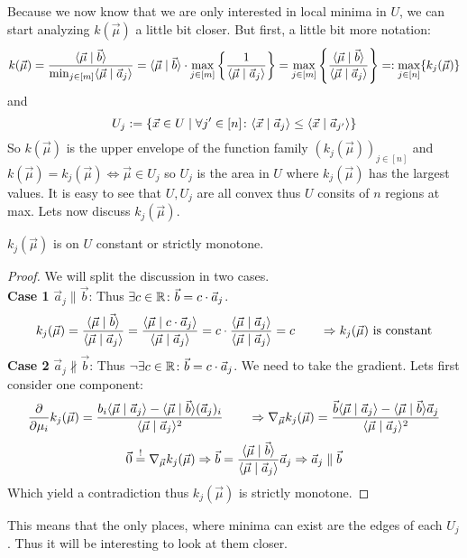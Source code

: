 Because we now know that we are only interested in local minima in $U$, we can start analyzing $k(\vec \mu)$ a little bit closer. But first, a little bit more notation:
$$k(\vec \mu) = \frac{\langle \vec{\mu} \mid \vec b \rangle}{\min_{j \in [m]} \langle \vec \mu \mid \vec a_j \rangle} = \langle \vec{\mu} \mid \vec b \rangle\cdot\max_{j \in [m]}\left\{\frac{1}{\langle \vec \mu \mid \vec a_j \rangle}\right\} = \max_{j \in [m]}\left\{\frac{\langle \vec{\mu} \mid \vec b \rangle}{\langle \vec \mu \mid \vec a_j \rangle}\right\} =: \max_{j\in[n]}\{k_j(\vec \mu)\}$$
and
$$U_j := \{\vec x \in U \mid \forall j' \in [n]\colon \langle \vec x \mid \vec a_j \rangle \leq \langle \vec x \mid \vec a_{j'} \rangle\}$$
So $k(\vec \mu)$ is the upper envelope of the function family $(k_j(\vec \mu))_{j \in [n]}$ and $k(\vec \mu) = k_j(\vec\mu) \Leftrightarrow \vec\mu \in U_j$ so $U_j$ is the area in $U$ where $k_j(\vec\mu)$ has the largest values. It is easy to see that $U, U_j$ are all convex thus $U$ consits of $n$ regions at max. Lets now discuss $k_j(\vec\mu)$.

\begin{lemma}
    $k_j(\vec\mu)$ is on $U$ constant or strictly monotone.
\end{lemma}
\begin{proof}
    We will split the discussion in two cases.\\
    \textbf{Case 1} $\vec a_j \parallel \vec b$: Thus $\exists c \in \mathbb{R}\colon \vec b = c \cdot \vec a_j$.
    $$k_j(\vec \mu) = \frac{\langle \vec \mu \mid \vec b \rangle}{\langle \vec \mu \mid \vec a_j \rangle} = \frac{\langle \vec \mu \mid c \cdot \vec a_j \rangle}{\langle \vec \mu \mid \vec a_j \rangle} = c \cdot \frac{\langle \vec \mu \mid \vec a_j \rangle}{\langle \vec \mu \mid \vec a_j \rangle} = c \qquad\Rightarrow k_j(\vec \mu)\textrm{ is constant}$$
    \textbf{Case 2} $\vec a_j \nparallel \vec b$: Thus $\lnot\exists c \in \mathbb{R}\colon \vec b = c \cdot \vec a_j$. We need to take the gradient. Lets first consider one component:
    $$\frac{\partial}{\partial \mu_i} k_j(\vec \mu) = \frac{b_i\langle \vec\mu \mid \vec a_j \rangle - \langle \vec\mu \mid \vec b \rangle(\vec a_j)_i}{\langle \vec\mu \mid \vec a_j \rangle^2} \qquad \Rightarrow \nabla_{\vec\mu} k_j(\vec\mu) = \frac{\vec b\langle \vec\mu \mid \vec a_j \rangle - \langle \vec\mu \mid \vec b \rangle\vec a_j}{\langle \vec\mu \mid \vec a_j \rangle^2}$$
    $$\vec 0 \stackrel{!}{=} \nabla_{\vec\mu} k_j(\vec\mu) \Rightarrow \vec b = \frac{\langle \vec \mu \mid \vec b \rangle}{\langle \vec \mu \mid \vec a_j \rangle}\vec a_j \Rightarrow \vec{a}_j \parallel \vec b$$
    Which yield a contradiction thus $k_j(\vec\mu)$ is strictly monotone.
\end{proof}

This means that the only places, where minima can exist are the edges of each $U_j$. Thus it will be interesting to look at them closer.

